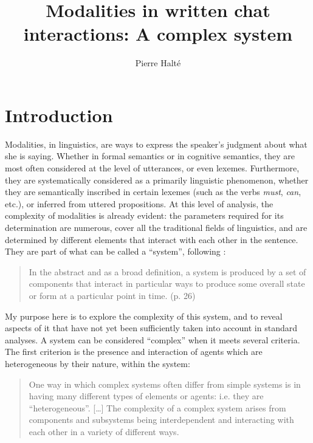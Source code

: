 \documentclass[output=paper]{langscibook}
\author{Pierre Halté\affiliation{Université de Paris}}
\title{{M}odalities in written chat interactions: A complex system}
\begin{document}
\AffiliationsWithoutIndexing{}
\maketitle 

\section{Introduction} 

Modalities, in linguistics, are ways to express the speaker’s judgment about what she is saying. Whether in formal semantics \citep{Portner2009} or in  cognitive semantics, they are most often considered at the level of utterances, or even lexemes. Furthermore, they are systematically considered as a primarily linguistic phenomenon, whether they are semantically inscribed in certain lexemes (such as the verbs \textit{must}, \textit{can}, etc.), or inferred from uttered propositions. At this level of analysis, the complexity of modalities is already evident: the parameters required for its determination are numerous, cover all the traditional fields of linguistics, and are determined by different elements that interact with each other in the sentence. They are part of what can be called a “system”, following \citet{Larsen-FreemanCameron2008}:

\begin{quote}
In the abstract and as a broad definition, a system is produced by a set of components that interact in particular ways to produce some overall state or form at a particular point in time. (p. 26)
\end{quote}

My purpose here is to explore the complexity of this system, and to reveal aspects of it that have not yet been sufficiently taken into account in standard analyses. A system can be considered “complex” when it meets several criteria. The first criterion is the presence and interaction of agents which are heterogeneous by their nature, within the system: 

\begin{quote}
One way in which complex systems often differ from simple systems is in having many different types of elements or agents: i.e. they are “heterogeneous”. […] The complexity of a complex system arises from components and subsystems being interdependent and interacting with each other in a variety of different ways. \citep[26]{Larsen-FreemanCameron2008}
\end{quote}
\end{document}
